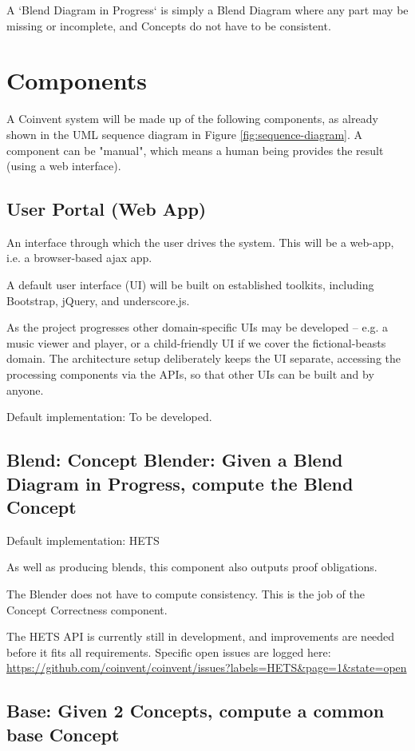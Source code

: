 A `Blend Diagram in Progress` is simply a Blend Diagram where any part may be missing or incomplete, and Concepts do not have to be consistent. 


\section{Components}\label{sec:components}

A Coinvent system will be made up of the following components, as already shown in the UML sequence diagram in Figure \ref{fig:sequence-diagram}.
A component can be "manual", which means a human being provides the result (using a web interface).

\subsection{User Portal (Web App)}\label{sec:userportal}
An interface through which the user drives the system. This will be a web-app,
i.e. a browser-based ajax app.

A default user interface (UI) will be built on established toolkits, including Bootstrap, jQuery, and underscore.js.

As the project progresses other domain-specific UIs may be developed -- e.g. a music viewer and player, 
or a child-friendly UI if we cover the fictional-beasts domain. 
The architecture setup deliberately keeps the UI separate, accessing the processing components via the APIs, so that other UIs can be built and by anyone.

Default implementation: To be developed.

\subsection{Blend: Concept Blender: Given a Blend Diagram in Progress, compute the Blend Concept}

Default implementation: HETS

As well as producing blends, this component also outputs proof obligations.

The Blender does not have to compute consistency. This is the job of the Concept Correctness component.

The HETS API is currently still in development, and improvements are needed
before it fits all requirements. Specific open issues are logged here: \url{https://github.com/coinvent/coinvent/issues?labels=HETS&page=1&state=open}

\subsection{Base: Given 2 Concepts, compute a common base Concept}

